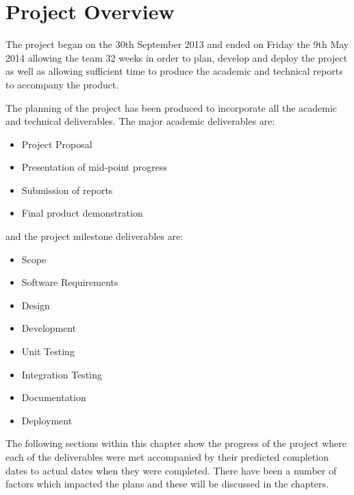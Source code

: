 \section{Project Overview}
\label{sec:project_overview}

The project began on the 30th September 2013 and ended on Friday the 9th May 2014 allowing the team 32 weeks in order to plan, develop and deploy the project as well as allowing sufficient time to produce the academic and technical reports to accompany the product. 

The planning of the project has been produced to incorporate all the academic and technical deliverables. The major academic deliverables are:

\begin{itemize}
 \item Project Proposal
 \item Presentation of mid-point progress
 \item Submission of reports
 \item Final product demonstration
\end{itemize}

and the project milestone deliverables are:

\begin{itemize}
 \item Scope
 \item Software Requirements
 \item Design
 \item Development
 \item Unit Testing
 \item Integration Testing
 \item Documentation
 \item Deployment
\end{itemize}

The following sections within this chapter show the progress of the project where each of the deliverables were met accompanied by their predicted completion dates to actual dates when they were completed. There have been a number of factors which impacted the plans and these will be discussed in the chapters. 
